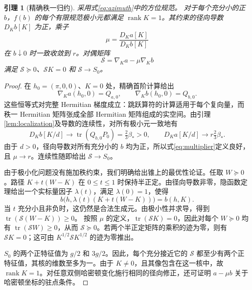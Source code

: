 \documentclass[UTF8,11pt,a4paper,fontset=fandol]{ctexart}
\newtheorem{lemma}[theorem]{引理}
\theoremstyle{definition}
\theoremstyle{remark}
\DeclareMathOperator{\tr}{tr}
\DeclareMathOperator{\rank}{rank}
\newcommand{\PSD}{\succeq0}
\begin{document}
\begin{lemma}[精确秩一归约]\label{lem:rank-one}
采用式\eqref{eq:azimuth}中的方位规范。
对于每个充分小的正 \(b\)，\(f(b)\) 的每个有限规范极小元都满足 \(\rank K=1\)。其约束的径向导数 \(D_Kb[K]\) 为正，乘子
\begin{equation}\label{eq:multiplier}
 \mu=\frac{D_Ka[K]}{D_Kb[K]}
\end{equation}
在 \(b\downarrow0\) 时一致收敛到 \(r\)。对偶矩阵
\begin{equation}\label{eq:dual}
 \mathcal S=\nabla_Ka-\mu\nabla_Kb
\end{equation}
满足 \(\mathcal S\PSD\)、\(\mathcal SK=0\) 和 \(\mathcal S\to S_0\)。
\end{lemma}
\begin{proof}
在 \(h_0=(\pi,0,0)\)、\(K=0\) 处，精确首阶计算给出
\[
 \nabla_Ka(h_0,0)=Q_{a,0},\qquad
 \nabla_Kb(h_0,0)=Q_{b,0}.
\]
这些恒等式对完整 Hermitian 梯度成立：跳跃算符的计算适用于每个复向量，而秩一 Hermitian 矩阵张成全部 Hermitian 矩阵组成的实空间。由引理\ref{lem:localization}及导数的连续性，对所有极小元一致地有
\[
 D_Kb[K/d]\longrightarrow\tr(Q_{b,0}P_0)=\tfrac23\beta_*>0,
 \qquad D_Ka[K/d]\longrightarrow r\tfrac23\beta_*.
\]
由于 \(d>0\)，径向导数对所有充分小的 \(b\) 均为正，所以式\eqref{eq:multiplier}定义良好，且 \(\mu\to r\)。连续性随即给出 \(\mathcal S\to S_0\)。

由于极小化问题没有施加秩约束，我们明确给出锥上的最优性论证。任取 \(W\PSD\)。路径 \(K+t(W-K)\) 在 \(0\leq t\leq1\) 时保持半正定。由径向导数非零，隐函数定理给出一个实标量因子 \(\lambda(t)\)，满足 \(\lambda(0)=1\)，使得
\[
 b\bigl(h,\lambda(t)(K+t(W-K))\bigr)=b(h,K).
\]
当 \(t\) 充分小且非负时，这仍然是合法生成元。由极小性并求导，得到
\(\tr(\mathcal S(W-K))\geq0\)。
按照 \(\mu\) 的定义，\(\tr(\mathcal SK)=0\)，因此对每个 \(W\PSD\) 均有 \(\tr(\mathcal SW)\geq0\)，从而 \(\mathcal S\PSD\)。若两个半正定矩阵的乘积的迹为零，则有 \(\mathcal SK=0\)；这可由 \(K^{1/2}\mathcal SK^{1/2}\) 的迹为零推出。

\(S_0\) 的两个正特征值为 \(g/2\) 和 \(3g/2\)。因此，每个充分接近它的 \(\mathcal S\) 都至少有两个正特征值，其核的维数至多为一。由于 \(K\ne0\)，且其像包含在这一核中，故 \(\rank K=1\)。对任意双侧哈密顿变化施行相同的径向修正，还可证明 \(a-\mu b\) 关于哈密顿坐标的驻点条件。
\end{proof}
\end{document}
